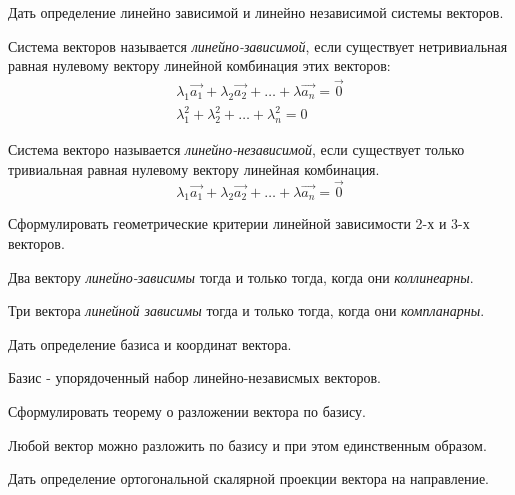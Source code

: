 \begin{question}
  Дать определение линейно зависимой и линейно независимой системы векторов.
\end{question}
\begin{answer}
  Система векторов называется \textit{линейно-зависимой}, если существует нетривиальная равная нулевому вектору линейной комбинация этих векторов:
  \begin{gather*}
    \lambda_1 \vec{a_1} + \lambda_2 \vec{a_2} + \ldots + \lambda \vec{a_n} = \vec{0} \\
    \lambda_1^2 + \lambda_2^2 + \ldots + \lambda_n^2 = 0
  \end{gather*}

  Система векторо называется \textit{линейно-независимой}, если существует только тривиальная равная нулевому вектору линейная комбинация.
  \[
    \lambda_1 \vec{a_1} + \lambda_2 \vec{a_2} + \ldots + \lambda \vec{a_n} = \vec{0}
  \] 
\end{answer}

\begin{question}
  Сформулировать геометрические критерии линейной зависимости 2-х и 3-х векторов.
\end{question}
\begin{answer}
  Два вектору \textit{линейно-зависимы} тогда и только тогда, когда они \textit{коллинеарны}.

  Три вектора \textit{линейной зависимы} тогда и только тогда, когда они \textit{компланарны}. 
\end{answer}

\begin{question}
  Дать определение базиса и координат вектора.
\end{question}
\begin{answer}
  Базис - упорядоченный набор линейно-независмых векторов. 
\end{answer}

\begin{question}
  Сформулировать теорему о разложении вектора по базису. 
\end{question}
\begin{answer}
  Любой вектор можно разложить по базису и при этом единственным образом.
\end{answer}

\begin{question}
  Дать определение ортогональной скалярной проекции вектора на направление.
\end{question}
 
